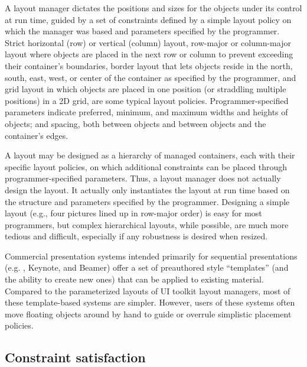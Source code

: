     A layout manager dictates the positions and sizes for the objects under its
    control at run time, guided by a set of constraints defined by a simple
    layout policy on which the manager was based and parameters specified by
    the programmer. Strict horizontal (row) or vertical (column) layout,
    row-major or column-major layout where objects are placed in the next row
    or column to prevent exceeding their container’s boundaries, border layout
    that lets objects reside in the north, south, east, west, or center of the
    container as specified by the programmer, and grid layout in which objects
    are placed in one position (or straddling multiple positions) in a 2D grid,
    are some typical layout policies. Programmer-specified parameters indicate
    preferred, minimum, and maximum widths and heights of objects; and spacing,
    both between objects and between objects and the container’s edges. 

    A layout may be designed as a hierarchy of managed containers, each with
    their specific layout policies, on which additional constraints can be
    placed through programmer-specified parameters. Thus, a layout manager
    does not actually design the layout. It actually only instantiates the
    layout at run time based on the structure and parameters specified by the
    programmer. Designing a simple layout (e.g., four pictures lined up in
    row-major order) is easy for most programmers, but complex hierarchical
    layouts, while possible, are much more tedious and difficult, especially if
    any robustness is desired when resized.

    Commercial presentation systems intended primarily for sequential
    presentations (e.g. \ppt, Keynote, and \latex Beamer) offer a set of
    preauthored style “templates” (and the ability to create new ones) that can
    be applied to existing material. Compared to the parameterized layouts of
    UI toolkit layout managers, most of these template-based systems are
    simpler. However, users of these systems often move floating objects
    around by hand to guide or overrule simplistic placement policies.

   \subsection{Constraint satisfaction}
    \label{constraint-satisfaction}


